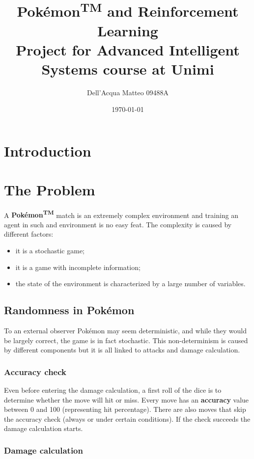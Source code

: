 \documentclass{article}
\title{Pokémon\textsuperscript{\small TM} and Reinforcement Learning\\ \large Project for Advanced Intelligent Systems course at Unimi}
\author{Dell'Acqua Matteo 09488A}
\date{\today}
\begin{document}
\maketitle
\newpage
\tableofcontents
\newpage

\section{Introduction}

\section{The Problem}

A \textbf{Pokémon\textsuperscript{\tiny TM}} match is an extremely complex environment and training an agent in such and environment is no easy feat. The complexity is caused by different factors:
\begin{itemize}
    \item it is a stochastic game;
    \item it is a game with incomplete information;
    \item the state of the environment is characterized by a large number of variables.
\end{itemize}

\subsection{Randomness in Pokémon}

To an external observer Pokémon may seem deterministic, and while they would be largely correct, the game is in fact stochastic. This non-determinism is caused by different components but it is all linked to attacks and damage calculation.

\subsubsection{Accuracy check}

Even before entering the damage calculation, a first roll of the dice is to determine whether the move will hit or miss. Every move has an \textbf{accuracy} value between 0 and 100 (representing hit percentage). There are also moves that skip the accuracy check (always or under certain conditions).
If the check succeeds the damage calculation starts.

\subsubsection{Damage calculation}
\end{document}
